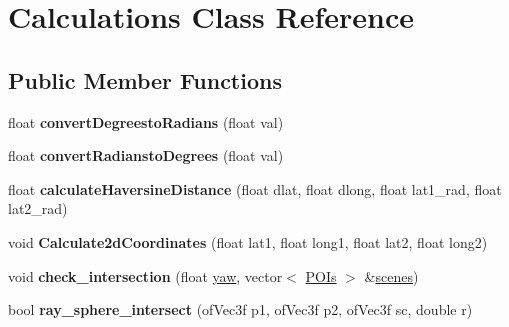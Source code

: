 \hypertarget{class_calculations}{\section{Calculations Class Reference}
\label{class_calculations}
}
\subsection*{Public Member Functions}
\begin{DoxyCompactItemize}
\item 
\hypertarget{class_calculations_ac8666b1e2fb424dcd21d26d1db753c9e}{float {\bfseries convert\-Degreesto\-Radians} (float val)}\label{class_calculations_ac8666b1e2fb424dcd21d26d1db753c9e}

\item 
\hypertarget{class_calculations_a2a475c3b2096e2bef3fa1c503a0d6f33}{float {\bfseries convert\-Radiansto\-Degrees} (float val)}\label{class_calculations_a2a475c3b2096e2bef3fa1c503a0d6f33}

\item 
\hypertarget{class_calculations_acd0920de0b16194317966bab3714b468}{float {\bfseries calculate\-Haversine\-Distance} (float dlat, float dlong, float lat1\-\_\-rad, float lat2\-\_\-rad)}\label{class_calculations_acd0920de0b16194317966bab3714b468}

\item 
\hypertarget{class_calculations_a38fbecc378883ac235029f3ed486e11b}{void {\bfseries Calculate2d\-Coordinates} (float lat1, float long1, float lat2, float long2)}\label{class_calculations_a38fbecc378883ac235029f3ed486e11b}

\item 
\hypertarget{class_calculations_ad8ed2102c1c20465253a06f756bd919b}{void {\bfseries check\-\_\-intersection} (float \hyperlink{test_app_8cpp_a7efc219781df4a1e281cb5d348b7fbf9}{yaw}, vector$<$ \hyperlink{class_p_o_is}{P\-O\-Is} $>$ \&\hyperlink{test_app_8cpp_a2a45ec4ebd7ddda05fdd49eb42148544}{scenes})}\label{class_calculations_ad8ed2102c1c20465253a06f756bd919b}

\item 
\hypertarget{class_calculations_a85384e54e773cd547fcc4b63d5f0ff3b}{bool {\bfseries ray\-\_\-sphere\-\_\-intersect} (of\-Vec3f p1, of\-Vec3f p2, of\-Vec3f sc, double r)}\label{class_calculations_a85384e54e773cd547fcc4b63d5f0ff3b}

\end{DoxyCompactItemize}
